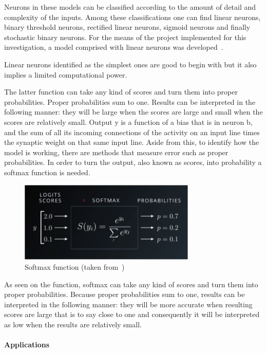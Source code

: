 Neurons in these models can be classified according to the amount of detail and complexity of the inputs. Among these classifications one can find linear neurons, binary threshold neurons, rectified linear neurons, sigmoid neurons and finally stochastic binary neurons. For the means of the project implemented for this investigation, a model comprised with linear neurons was developed~\cite{hinton13}. 

Linear neurons identified as the simplest ones are good to begin with but it also implies a limited computational power.

The latter function can take any kind of scores and turn them into proper probabilities. Proper probabilities sum to one.  Results can be interpreted in the following manner: they will be large when the scores are large and small when the scores are relatively small. 
Output y is a function of a bias that is in neuron b, and the sum of all its incoming connections of the activity on an input line times the synaptic weight on that same input line. Aside from this, to identify how the model is working, there are methods that measure error such as proper probabilities. In order to turn the output, also known as scores, into probability a softmax function is needed.

\begin{figure}[htbp]
  \centering
  \includegraphics[width=0.75\textwidth]{images/softmax}
  \caption{ Softmax function (taken from~\cite{hinton13}) }
  \label{fig:softmax}
\end{figure}

As seen on the  function, softmax can take any kind of scores and turn them into proper probabilities. Because proper probabilities sum to one, results can be interpreted in the following manner: they will be more accurate when resulting scores are large that is to say close to one and consequently it will be interpreted as low when the results are relatively small. 


\paragraph{Applications}

